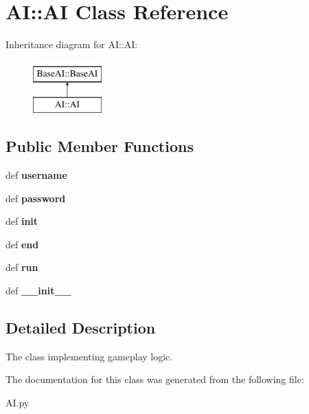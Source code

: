 \hypertarget{classAI_1_1AI}{
\section{AI::AI Class Reference}
\label{classAI_1_1AI}
}
Inheritance diagram for AI::AI:\begin{figure}[H]
\begin{center}
\leavevmode
\includegraphics[height=2.000000cm]{classAI_1_1AI}
\end{center}
\end{figure}
\subsection*{Public Member Functions}
\begin{DoxyCompactItemize}
\item 
\hypertarget{classAI_1_1AI_a1173d35565e571260327628b5fdbf601}{
def {\bfseries username}}
\label{classAI_1_1AI_a1173d35565e571260327628b5fdbf601}

\item 
\hypertarget{classAI_1_1AI_a0c68d55972c20f5b5c12b3413dccf4f8}{
def {\bfseries password}}
\label{classAI_1_1AI_a0c68d55972c20f5b5c12b3413dccf4f8}

\item 
\hypertarget{classAI_1_1AI_abe85fa052f61e71327d0f066866360ec}{
def {\bfseries init}}
\label{classAI_1_1AI_abe85fa052f61e71327d0f066866360ec}

\item 
\hypertarget{classAI_1_1AI_a42dd3d0b74c0e3aae12c5d6165ec1d37}{
def {\bfseries end}}
\label{classAI_1_1AI_a42dd3d0b74c0e3aae12c5d6165ec1d37}

\item 
\hypertarget{classAI_1_1AI_a0e95ce8db48896cbf1dcf410930ca141}{
def {\bfseries run}}
\label{classAI_1_1AI_a0e95ce8db48896cbf1dcf410930ca141}

\item 
\hypertarget{classAI_1_1AI_afc336c04d31701982b4aa115de277f2a}{
def {\bfseries \_\-\_\-init\_\-\_\-}}
\label{classAI_1_1AI_afc336c04d31701982b4aa115de277f2a}

\end{DoxyCompactItemize}


\subsection{Detailed Description}
\begin{DoxyVerb}The class implementing gameplay logic.\end{DoxyVerb}
 

The documentation for this class was generated from the following file:\begin{DoxyCompactItemize}
\item 
AI.py\end{DoxyCompactItemize}
